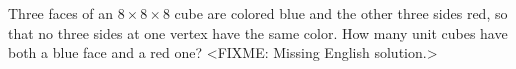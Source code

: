 \problem
Three faces of an $8 \times 8 \times 8$ cube are colored blue and the other
three sides red, so that no three sides at one vertex have the same color.
How many unit cubes have both a blue face and a red one?
\solution
<FIXME: Missing English solution.>
\endproblem
